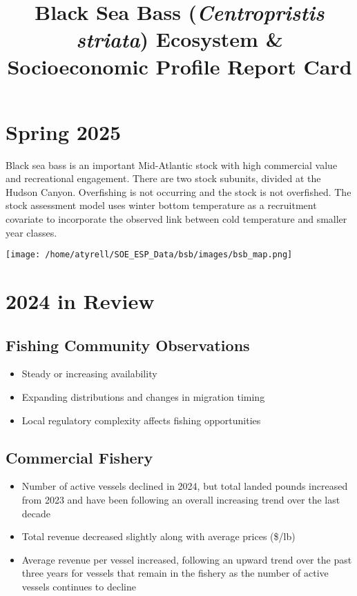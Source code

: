 \documentclass[
]{article}
\title{Black Sea Bass (\protect\textit{Centropristis striata})
\protect\newline Ecosystem \& Socioeconomic Profile Report Card}
\author{}
\date{\vspace{-2.5em}}
\providecommand{\tightlist}{%
  \setlength{\itemsep}{0pt}\setlength{\parskip}{0pt}}
\begin{document}
\maketitle

\vspace{-2.5cm}
\section{Spring 2025}

Black sea bass is an important Mid-Atlantic stock with high commercial
value and recreational engagement. There are two stock subunits, divided
at the Hudson Canyon. Overfishing is not occurring and the stock is not
overfished. The stock assessment model uses winter bottom temperature as
a recruitment covariate to incorporate the observed link between cold
temperature and smaller year classes.

\texttt{[image: /home/atyrell/SOE\_ESP\_Data/bsb/images/bsb\_map.png]}

\hfill

\section{2024 in Review}

\subsection{Fishing Community Observations}

\begin{itemize}
\tightlist
\item
  Steady or increasing availability
\item
  Expanding distributions and changes in migration timing
\item
  Local regulatory complexity affects fishing opportunities
\end{itemize}

\subsection{Commercial Fishery}

\begin{itemize}
\tightlist
\item
  Number of active vessels declined in 2024, but total landed pounds
  increased from 2023 and have been following an overall increasing
  trend over the last decade
\item
  Total revenue decreased slightly along with average prices (\$/lb)
\item
  Average revenue per vessel increased, following an upward trend over
  the past three years for vessels that remain in the fishery as the
  number of active vessels continues to decline
\end{itemize}
\end{document}
